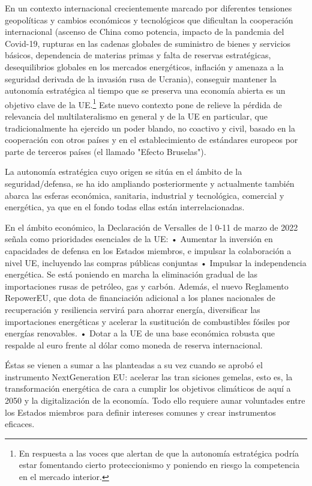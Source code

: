\documentclass[10pt,a4paper]{article}
\begin{document}
En un contexto internacional crecientemente marcado por diferentes tensiones geopolíticas y cambios económicos y tecnológicos que dificultan la cooperación internacional (ascenso de China como potencia, impacto de la pandcmia del Covid-19, rupturas en las cadenas globales de suministro de bienes y servicios básicos, dependencia de materias primas y falta de reservas estratégicas, desequilibrios globales en los mercados energéticos, inflación y amenaza a la seguridad derivada de la invasión rusa de Ucrania), conseguir mantener la autonomía estratégica al tiempo que se preserva una economía abierta es un objetivo clave de la UE.\footnote{%
    En respuesta a las voces que alertan de que la autonomía estratégica podría estar fomentando cierto proteccionismo y poniendo en riesgo la competencia en el mercado interior.
} Este nuevo contexto pone de relieve la pérdida de relevancia del multilateralismo en general y de la UE en particular, que tradicionalmente ha ejercido un poder blando, no coactivo y civil, basado en la cooperación con otros países y en el establecimiento de estándares europeos por parte de terceros países (el llamado "Efecto Bruselas").

La autonomía estratégica cuyo origen se sitúa en el ámbito de la seguridad/defensa, se ha ido ampliando posteriormente y actualmente también abarca las esferas económica, sanitaria, industrial y tecnológica, comercial y energética, ya que en el fondo todas ellas están interrelacionadas.

En el ámbito económico, la Declaración de Versalles de l 0-11 de marzo de 2022 señala como prioridades esenciales de la UE:
• Aumentar la inversión en capacidades de defensa en los Estados miembros, e impulsar la colaboración a nivel UE, incluyendo las compras públicas conjuntas
• Impulsar la independencia energética. Se está poniendo en marcha la eliminación gradual de las importaciones rusas de petróleo, gas y carbón. Además, el nuevo Reglamento RepowerEU, que dota de financiación adicional a los planes nacionales de recuperación y resiliencia servirá para ahorrar energía, diversificar las importaciones energéticas y acelerar la sustitución de combustibles fósiles por energías renovables.
• Dotar a la UE de una base económica robusta que respalde al euro frente al dólar como moneda de reserva internacional.

Éstas se vienen a sumar a las planteadas a su vez cuando se aprobó el instrumento NextGeneration EU: acelerar las tran siciones gemelas, esto es, la transformación energética de cara a cumplir los objetivos climáticos de aquí a 2050 y la digitalización de la economía. Todo ello requiere aunar voluntades entre los Estados miembros para definir intereses comunes y crear instrumentos eficaces.
\end{document}
